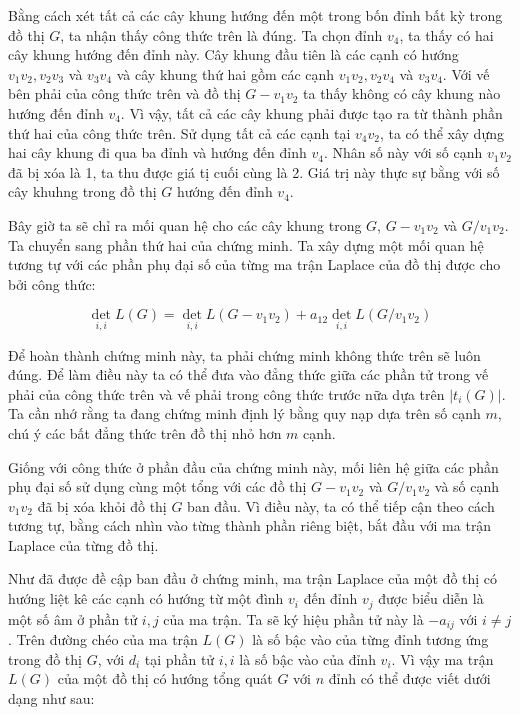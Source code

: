 \documentclass[14pt, a4paper]{article}
\numberwithin{equation}{section}
\numberwithin{figure}{section}
\numberwithin{dl}{section}
\numberwithin{md}{section}
\numberwithin{bd}{section}
\numberwithin{dn}{section}
\numberwithin{hq}{section}
\begin{document}
    Bằng cách xét tất cả các cây khung hướng đến một trong bốn đỉnh bất kỳ trong đồ thị $G$, ta nhận thấy công thức trên là đúng.
    Ta chọn đỉnh $v_4$, ta thấy có hai cây khung hướng đến đỉnh này.
    Cây khung đầu tiên là các cạnh có hướng $v_1 v_2, v_2 v_3$ và $v_3 v_4$ và cây khung thứ hai gồm các cạnh $v_1 v_2, v_2 v_4$ và $v_3 v_4$.
    Với vế bên phải của công thức trên và đồ thị $G - v_1 v_2$ ta thấy không có cây khung nào hướng đến đỉnh $v_4$.
    Vì vậy, tất cả các cây khung phải được tạo ra từ thành phần thứ hai của công thức trên.
    Sử dụng tất cả các cạnh tại $v_4 v_2$, ta có thể xây dựng hai cây khung đi qua ba đỉnh và hướng đến đỉnh $v_4$.
    Nhân số này với số cạnh $v_1 v_2$ đã bị xóa là 1, ta thu được giá tị cuối cùng là 2.
    Giá trị này thực sự bằng với số cây khuhng trong đồ thị $G$ hướng đến đỉnh $v_4$.

    Bây giờ ta sẽ chỉ ra mối quan hệ cho các cây khung trong $G$, $G - v_1 v_2$ và $G / v_1 v_2$.
    Ta chuyển sang phần thứ hai của chứng minh.
    Ta xây dựng một mối quan hệ tương tự với các phần phụ đại số của từng ma trận Laplace của đồ thị được cho bởi công thức:

    \begin{equation}
        \det_{i, i} L(G) = \det_{i, i} L(G - v_1 v_2) + a_{12} \det_{i, i} L (G / v_1 v_2)
    \end{equation}

    Để hoàn thành chứng minh này, ta phải chứng minh không thức trên sẽ luôn đúng.
    Để làm điều này ta có thể đưa vào đẳng thức giữa các phần tử trong vế phải của công thức trên và vế phải trong công thức trước nữa dựa trên $\lvert t_i (G) \rvert$.
    Ta cần nhớ rằng ta đang chứng minh định lý bằng quy nạp dựa trên số cạnh $m$, chú ý các bất đẳng thức trên đồ thị nhỏ hơn $m$ cạnh.

    Giống với công thức ở phần đầu của chứng minh này, mối liên hệ giữa các phần phụ đại số sử dụng cùng một tổng với các đồ thị $G - v_1 v_2$ và $G / v_1 v_2$ và số cạnh $v_1 v_2$ đã bị xóa khỏi đồ thị $G$ ban đầu.
    Vì điều này, ta có thể tiếp cận theo cách tương tự, bằng cách nhìn vào từng thành phần riêng biệt, bắt đầu với ma trận Laplace của từng đồ thị.

    Như đã được đề cập ban đầu ở chứng minh, ma trận Laplace  của một đồ thị có hướng liệt kê các cạnh có hướng từ một đình $v_i$ đến đỉnh $v_j$ được biểu diễn là một số âm ở phần tử $i, j$ của ma trận.
    Ta sẽ ký hiệu phần tử này là $-a_{ij}$ với $i \neq j$.
    Trên đường chéo của ma trận $L(G)$ là số bậc vào của từng đỉnh tương ứng trong đồ thị $G$, với $d_i$ tại phần tử $i, i$ là số bậc vào của đỉnh $v_i$.
    Vì vậy ma trận $L(G)$ của một đồ thị có hướng tổng quát $G$ với $n$ đỉnh có thể được viết dưới dạng như sau:
\end{document}
